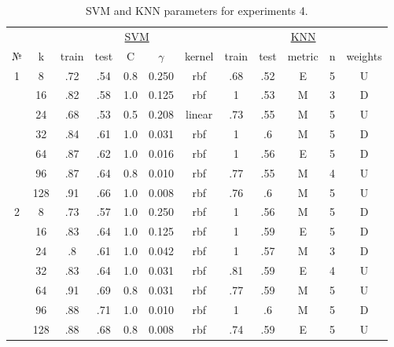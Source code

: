 \begin{table}
\centering
\caption{SVM and KNN parameters for experiments 4.}
\label{tab:params_4_svm_knn}
\begin{tabular}{|c|c|ccccc||ccccc|}\hline
& & \multicolumn{5}{c||}{\underline{SVM}} & \multicolumn{5}{c|}{\underline{KNN}}\\
№ &   k & train & test &   C & $\gamma$ & kernel & train & test & metric & n & weights \\\hline
1 &   8 &   .72 &  .54 & 0.8 &    0.250 &    rbf &   .68 &  .52 &      E & 5 &       U \\
  &  16 &   .82 &  .58 & 1.0 &    0.125 &    rbf &     1 &  .53 &      M & 3 &       D \\
  &  24 &   .68 &  .53 & 0.5 &    0.208 & linear &   .73 &  .55 &      M & 5 &       U \\
  &  32 &   .84 &  .61 & 1.0 &    0.031 &    rbf &     1 &   .6 &      M & 5 &       D \\
  &  64 &   .87 &  .62 & 1.0 &    0.016 &    rbf &     1 &  .56 &      E & 5 &       D \\
  &  96 &   .87 &  .64 & 0.8 &    0.010 &    rbf &   .77 &  .55 &      M & 4 &       U \\
  & 128 &   .91 &  .66 & 1.0 &    0.008 &    rbf &   .76 &   .6 &      M & 5 &       U \\\hline
2 &   8 &   .73 &  .57 & 1.0 &    0.250 &    rbf &     1 &  .56 &      M & 5 &       D \\
  &  16 &   .83 &  .64 & 1.0 &    0.125 &    rbf &     1 &  .59 &      E & 5 &       D \\
  &  24 &    .8 &  .61 & 1.0 &    0.042 &    rbf &     1 &  .57 &      M & 3 &       D \\
  &  32 &   .83 &  .64 & 1.0 &    0.031 &    rbf &   .81 &  .59 &      E & 4 &       U \\
  &  64 &   .91 &  .69 & 0.8 &    0.031 &    rbf &   .77 &  .59 &      M & 5 &       U \\
  &  96 &   .88 &  .71 & 1.0 &    0.010 &    rbf &     1 &   .6 &      M & 5 &       D \\
  & 128 &   .88 &  .68 & 0.8 &    0.008 &    rbf &   .74 &  .59 &      E & 5 &       U \\\hline
\end{tabular}
\end{table}
